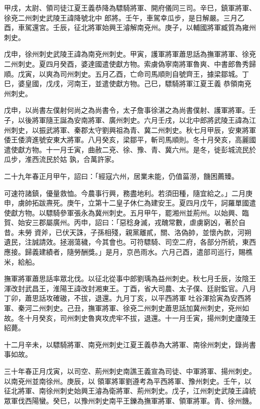 \begin{pinyinscope}
 甲戌，太尉、領司徒江夏王義恭降為驃騎將軍、開府儀同三司。辛巳，鎮軍將軍、徐兗二州刺史武陵王諱降號北中
 郎將。壬午，車駕幸瓜步，是日解嚴。三月乙酉，車駕還宮。壬辰，征北將軍始興王濬解南兗州。庚子，以輔國將軍臧質為雍州刺史。



 戊申，徐州刺史武陵王諱為南兗州刺史。甲寅，護軍將軍蕭思話為撫軍將軍、徐兗二州刺史。夏四月癸酉，婆達國遣使獻方物。索虜偽寧南將軍魯爽、中書郎魯秀歸順。戊寅，以爽為司州刺史。五月乙酉，亡命司馬順則自號齊王，據梁鄒城。丁巳，婆皇國，戊戌，河南王，並遣使獻方物。己巳，驃騎將軍江夏王義
 恭領南兗州刺史。



 戊申，以尚書左僕射何尚之為尚書令，太子詹事徐湛之為尚書僕射、護軍將軍。壬子，以後將軍隨王誕為安南將軍、廣州刺史。六月壬戌，以北中郎將武陵王諱為江州刺史，以振武將軍、秦郡太守劉興祖為青、冀二州刺史。秋七月甲辰，安東將軍倭王倭濟進號安東大將軍。八月癸亥，梁鄒平，斬司馬順則。冬十月癸亥，高麗國遣使獻方物。十一月壬寅，曲赦二兗、徐、豫、青、冀六州。是冬，徙彭城流民於瓜步，淮西流民於姑
 孰，合萬許家。



 二十九年春正月甲午，詔曰：「經寇六州，居業未能，仍值菑澇，饑困薦臻。



 可速符諸鎮，優量救恤。今農事行興，務盡地利。若須田種，隨宜給之。」二月庚申，虜帥拓跋燾死。庚午，立第十二皇子休仁為建安王。夏四月戊午，訶羅單國遣使獻方物。以驃騎參軍張永為冀州刺史。五月甲午，罷湘州並荊州。以始興、臨賀、始安三郡屬廣州。丙申，詔曰：「惡稔身滅，戎醜常數，虐虜窮凶，著於自昔。未勞
 資斧，已伏天誅，子孫相殘，親黨離貳，關、洛偽帥，並懷內款，河朔遺民，注誠請效。拯溺蕩穢，今其會也。可符驃騎、司空二府，各部分所統，東西應接。歸義建績者，隨勞酬獎。」是月，京邑雨水。六月己酉，遣部司巡行，賜樵米，給船。



 撫軍將軍蕭思話率眾北伐。以征北從事中郎劉瑀為益州刺史。秋七月壬辰，汝陰王渾改封武昌王，淮陽王諱改封湘東王。丁酉，省大司農、太子僕、廷尉監官。八月丁卯，蕭思話攻確磝，不拔，退還。九月丁亥，以平西將軍
 吐谷渾拾寅為安西將軍、秦河二州刺史。己丑，撫軍將軍、徐兗二州刺史蕭思話加冀州刺史，兗州如故。冬十月癸亥，司州刺史魯爽攻虎牢不拔，退還。十一月壬寅，揚州刺史廬陵王紹薨。



 十二月辛未，以驃騎將軍、南兗州刺史江夏王義恭為大將軍、南徐州刺史，錄尚書事如故。



 三十年春正月戊寅，以司空、荊州刺史南譙王義宣為司徒、中軍將軍、揚州刺史。以南兗州並南徐州。庚辰，以
 領軍將軍劉遵考為平西將軍、豫州刺史。壬午，以征北將軍、南徐州刺史始興王濬為衛將軍、荊州刺史。戊子，江州刺史武陵王諱統眾軍伐西陽蠻。癸巳，以豫州刺史南平王鑠為撫軍將軍、領軍將軍。青、徐州饑。




\end{pinyinscope}
